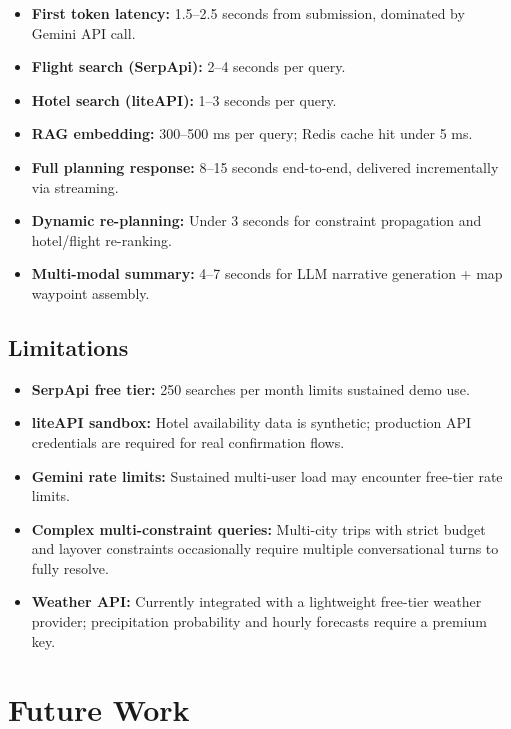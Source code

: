 \documentclass[12pt, a4paper]{article}
\begin{document}
\begin{itemize}[leftmargin=1.5cm, itemsep=0.3em]
  \item \textbf{First token latency:} 1.5--2.5 seconds from submission, dominated by Gemini API call.
  \item \textbf{Flight search (SerpApi):} 2--4 seconds per query.
  \item \textbf{Hotel search (liteAPI):} 1--3 seconds per query.
  \item \textbf{RAG embedding:} 300--500 ms per query; Redis cache hit under 5 ms.
  \item \textbf{Full planning response:} 8--15 seconds end-to-end, delivered incrementally via streaming.
  \item \textbf{Dynamic re-planning:} Under 3 seconds for constraint propagation and hotel/flight re-ranking.
  \item \textbf{Multi-modal summary:} 4--7 seconds for LLM narrative generation + map waypoint assembly.
\end{itemize}

\subsection{Limitations}

\begin{itemize}[leftmargin=1.5cm, itemsep=0.3em]
  \item \textbf{SerpApi free tier:} 250 searches per month limits sustained demo use.
  \item \textbf{liteAPI sandbox:} Hotel availability data is synthetic; production API credentials are required for real confirmation flows.
  \item \textbf{Gemini rate limits:} Sustained multi-user load may encounter free-tier rate limits.
  \item \textbf{Complex multi-constraint queries:} Multi-city trips with strict budget and layover constraints occasionally require multiple conversational turns to fully resolve.
  \item \textbf{Weather API:} Currently integrated with a lightweight free-tier weather provider; precipitation probability and hourly forecasts require a premium key.
\end{itemize}

\section{Future Work}
\end{document}
